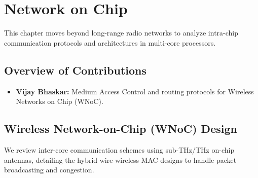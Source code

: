 \chapter{Network on Chip}
\label{sec:chapter12}

This chapter moves beyond long-range radio networks to analyze intra-chip communication protocols and architectures in multi-core processors.

\section{Overview of Contributions}
\begin{itemize}
    \item \textbf{Vijay Bhaskar:} Medium Access Control and routing protocols for Wireless Networks on Chip (WNoC).
\end{itemize}

\section{Wireless Network-on-Chip (WNoC) Design}
We review inter-core communication schemes using sub-THz/THz on-chip antennas, detailing the hybrid wire-wireless MAC designs to handle packet broadcasting and congestion.
